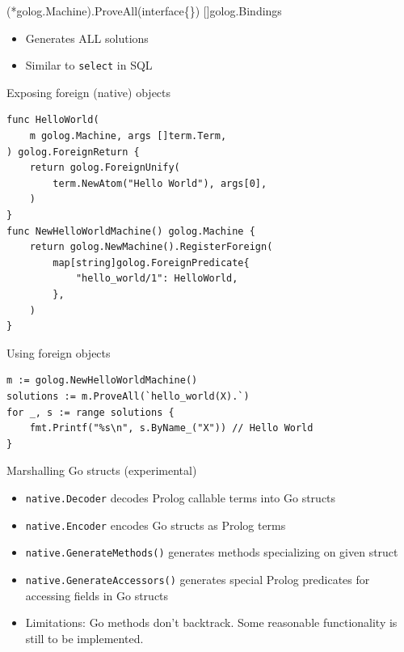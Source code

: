 \documentclass[presentation]{beamer}
\begin{document}
\begin{frame}[fragile,label=sec-3-5]{(*golog.Machine).ProveAll(interface\{\}) []golog.Bindings}
 \begin{itemize}
\item Generates \alert{ALL} solutions
\item Similar to \texttt{select} in SQL
\end{itemize}
\end{frame}

\begin{frame}[fragile,label=sec-3-6]{Exposing foreign (native) objects}
 \begin{verbatim}
func HelloWorld(
    m golog.Machine, args []term.Term,
) golog.ForeignReturn {
    return golog.ForeignUnify(
        term.NewAtom("Hello World"), args[0],
    )
}
func NewHelloWorldMachine() golog.Machine {
    return golog.NewMachine().RegisterForeign(
        map[string]golog.ForeignPredicate{
            "hello_world/1": HelloWorld,
        },
    )
}
\end{verbatim}
\end{frame}

\begin{frame}[fragile,label=sec-3-7]{Using foreign objects}
 \begin{verbatim}
m := golog.NewHelloWorldMachine()
solutions := m.ProveAll(`hello_world(X).`)
for _, s := range solutions {
    fmt.Printf("%s\n", s.ByName_("X")) // Hello World
}
\end{verbatim}
\end{frame}

\begin{frame}[fragile,label=sec-3-8]{Marshalling Go structs (experimental)}
 \begin{itemize}
\item \texttt{native.Decoder} decodes Prolog callable terms into Go structs
\item \texttt{native.Encoder} encodes Go structs as Prolog terms
\item \texttt{native.GenerateMethods()} generates methods specializing on
given struct
\item \texttt{native.GenerateAccessors()} generates special Prolog predicates
for accessing fields in Go structs
\item \alert{Limitations:} Go methods don't backtrack.  Some reasonable
functionality is still to be implemented.
\end{itemize}
\end{frame}
\end{document}
